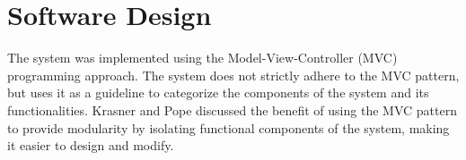 \section{Software Design}

The system was implemented using the Model-View-Controller (MVC) programming approach. The system does not strictly adhere to the MVC pattern, but uses it as a guideline to categorize the components of the system and its functionalities. Krasner and Pope \autocite{krasner-pope-88} discussed the benefit of using the MVC pattern to provide modularity by isolating functional components of the system, making it easier to design and modify.



 